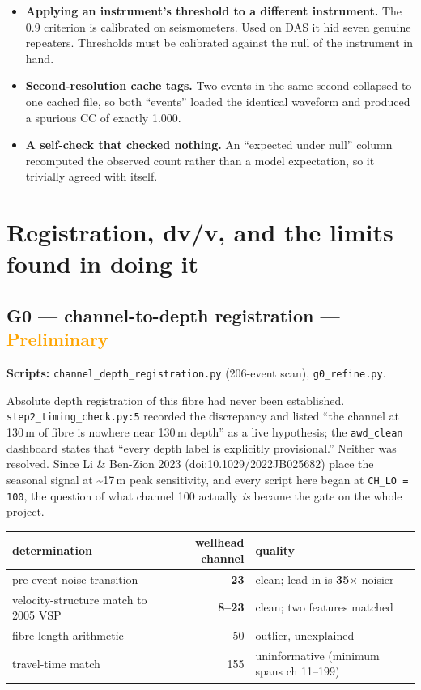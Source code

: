 \documentclass[11pt]{article}
\newcommand{\preliminary}{\textcolor{orange}{\textbf{Preliminary}}}
\begin{document}
\begin{itemize}[leftmargin=*]
  believable but meaningless null.
  \item \textbf{Applying an instrument's threshold to a different instrument.}
  The 0.9 criterion is calibrated on seismometers. Used on DAS it hid seven
  genuine repeaters. Thresholds must be calibrated against the null of the
  instrument in hand.
  \item \textbf{Second-resolution cache tags.} Two events in the same second
  collapsed to one cached file, so both ``events'' loaded the identical waveform
  and produced a spurious CC of exactly 1.000.
  \item \textbf{A self-check that checked nothing.} An ``expected under null''
  column recomputed the observed count rather than a model expectation, so it
  trivially agreed with itself.
\end{itemize}

\section{Registration, dv/v, and the limits found in doing it}

\subsection{G0 --- channel-to-depth registration --- \preliminary}

\textbf{Scripts:} \texttt{channel\_depth\_registration.py} (206-event scan),
\texttt{g0\_refine.py}.

Absolute depth registration of this fibre had never been established.
\texttt{step2\_timing\_check.py:5} recorded the discrepancy and listed ``the channel
at 130\,m of fibre is nowhere near 130\,m depth'' as a live hypothesis; the
\texttt{awd\_clean} dashboard states that ``every depth label is explicitly
provisional.'' Neither was resolved. Since Li \& Ben-Zion 2023
(doi:10.1029/2022JB025682) place the seasonal signal at \textasciitilde17\,m peak
sensitivity, and every script here began at \texttt{CH\_LO = 100}, the question of
what channel 100 actually \emph{is} became the gate on the whole project.

\begin{table}[H]
\centering
\begin{tabular}{lrl}
\toprule
determination & wellhead channel & quality \\
\midrule
pre-event noise transition & \textbf{23} & clean; lead-in is \textbf{35$\times$} noisier \\
velocity-structure match to 2005 VSP & \textbf{8--23} & clean; two features matched \\
fibre-length arithmetic & 50 & outlier, unexplained \\
travel-time match & 155 & uninformative (minimum spans ch 11--199) \\
\bottomrule
\end{tabular}
\end{table}
\end{document}
